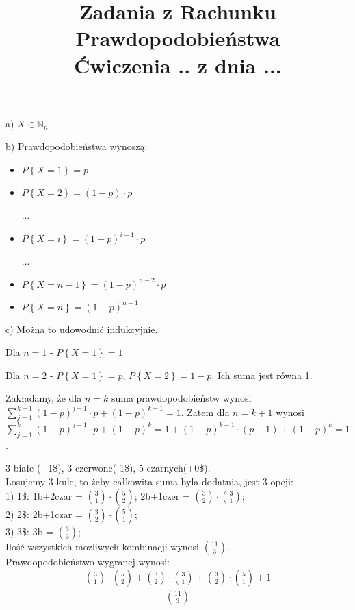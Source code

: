 \documentclass[fleqn]{article}
\begin{document}
\title{Zadania z Rachunku Prawdopodobieństwa \\ Ćwiczenia .. z dnia ...}
\date{}
\medskip
{}
\medskip

a) $X\in\mathbb{N}_n$

b) Prawdopodobieństwa wynoszą:
\begin{itemize}
\item $P\left\lbrace X=1 \right\rbrace=p$
\item $P\left\lbrace X=2 \right\rbrace=\left(1-p\right)\cdot p$

...

\item $P\left\lbrace X=i \right\rbrace=\left(1-p\right)^{i-1}\cdot p$

...

\item $P\left\lbrace X=n-1 \right\rbrace=\left(1-p\right)^{n-2}\cdot p$
\item $P\left\lbrace X=n \right\rbrace=\left(1-p\right)^{n-1}$
\end{itemize}
c) Można to udowodnić indukcyjnie.

Dla $n=1$ - $P\left\lbrace X=1 \right\rbrace=1$

Dla $n=2$ - $P\left\lbrace X=1 \right\rbrace=p$, $P\left\lbrace X=2 \right\rbrace=1-p$. Ich suma jest równa 1.

Zakładamy, że dla $n=k$ suma prawdopodobieństw wynosi $\sum\limits_{j=1}^{k-1}\left(1-p\right)^{j-1}\cdot p+\left(1-p\right)^{k-1}=1$.
Zatem dla $n=k+1$ wynosi $\sum\limits_{j=1}^{k}\left(1-p\right)^{j-1}\cdot p+\left(1-p\right)^{k}=1+\left(1-p\right)^{k-1}\cdot \left( p-1\right)+\left(1-p\right)^{k}=1$.

\medskip
{}
\medskip

3 białe (+1\$), 3 czerwone(-1\$), 5 czarnych(+0\$). \\
Losujemy 3 kule, to żeby całkowita suma byla dodatnia, jest 3 opcji: \\
1) 1\$: 1b+2czar = ${3 \choose 1} \cdot {5 \choose 2}$;  2b+1czer = ${3 \choose 2} \cdot {3 \choose 1}$; \\

2) 2\$: 2b+1czar = ${3 \choose 2} \cdot {5 \choose 1}$; \\

3) 3\$: 3b = ${3 \choose 3}$; \\

Ilość wszystkich mozliwych kombinacji wynosi ${11 \choose 3}$. \\
Prawdopodobieństwo wygranej wynosi:
\[\frac{{3 \choose 1} \cdot {5 \choose 2} + {3 \choose 2} \cdot {3 \choose 1} + {3 \choose 2} \cdot {5 \choose 1} + 1}{{11 \choose 3}}\]
\end{document}
